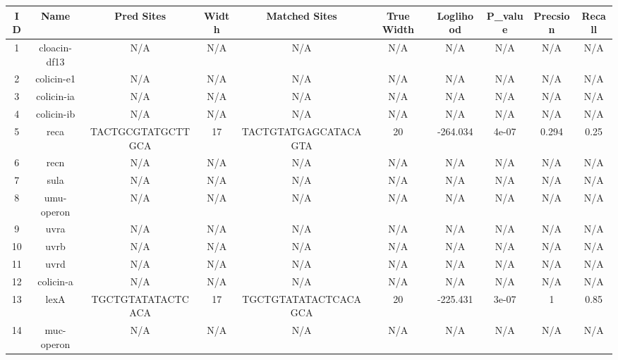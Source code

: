 \documentclass{article}
\begin{document}
\begin{table}
\begin{tabular}{c|c|c|c|c|c|c|c|c|c}
\toprule
 ID &     Name &         Pred Sites & Width &            Matched Sites & True Width &  Loglihood &   P\_value &  Precsion &  Recall \\
\midrule
   1 &  cloacin-df13 &                N/A &   N/A &                   N/A &        N/A &       N/A &      N/A &      N/A &    N/A \\
  2 &    colicin-e1 &                N/A &   N/A &                   N/A &        N/A &       N/A &      N/A &      N/A &    N/A \\
  3 &    colicin-ia &                N/A &   N/A &                   N/A &        N/A &       N/A &      N/A &      N/A &    N/A \\
  4 &    colicin-ib &                N/A &   N/A &                   N/A &        N/A &       N/A &      N/A &      N/A &    N/A \\
  5 &          reca &  TACTGCGTATGCTTGCA &    17 &  TACTGTATGAGCATACAGTA &         20 &  -264.034 &    4e-07 &    0.294 &   0.25 \\
  6 &          recn &                N/A &   N/A &                   N/A &        N/A &       N/A &      N/A &      N/A &    N/A \\
  7 &          sula &                N/A &   N/A &                   N/A &        N/A &       N/A &      N/A &      N/A &    N/A \\
  8 &    umu-operon &                N/A &   N/A &                   N/A &        N/A &       N/A &      N/A &      N/A &    N/A \\
  9 &          uvra &                N/A &   N/A &                   N/A &        N/A &       N/A &      N/A &      N/A &    N/A \\
 10 &          uvrb &                N/A &   N/A &                   N/A &        N/A &       N/A &      N/A &      N/A &    N/A \\
 11 &          uvrd &                N/A &   N/A &                   N/A &        N/A &       N/A &      N/A &      N/A &    N/A \\
 12 &     colicin-a &                N/A &   N/A &                   N/A &        N/A &       N/A &      N/A &      N/A &    N/A \\
 13 &          lexA &  TGCTGTATATACTCACA &    17 &  TGCTGTATATACTCACAGCA &         20 &  -225.431 &    3e-07 &        1 &   0.85 \\
 14 &    muc-operon &                N/A &   N/A &                   N/A &        N/A &       N/A &      N/A &      N/A &    N/A \\

\end{tabular}
\end{table}
\end{document}
